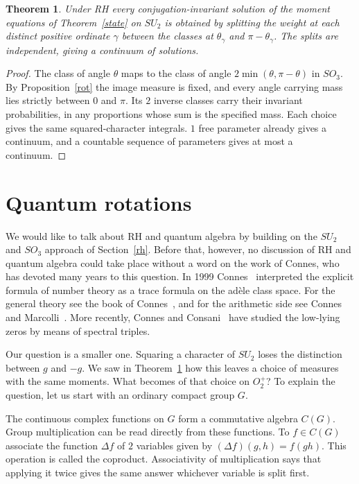 \documentclass[11pt,a4paper]{article}
\newtheorem{thm}{Theorem}[section]
\begin{document}
\begin{samepage}
\begin{thm}\label{classicallifts}
Under RH every conjugation-invariant solution of the moment equations of Theorem~\textup{\ref{state}} on $SU_2$ is obtained by splitting the weight at each distinct positive ordinate $\gamma$ between the classes at $\theta_\gamma$ and $\pi-\theta_\gamma$. The splits are independent, giving a continuum of solutions.
\end{thm}
\end{samepage}
\begin{proof}
The class of angle $\theta$ maps to the class of angle $2\min(\theta,\pi-\theta)$ in $SO_3$. By Proposition~\ref{rot} the image measure is fixed, and every angle carrying mass lies strictly between $0$ and $\pi$. Its $2$ inverse classes carry their invariant probabilities, in any proportions whose sum is the specified mass. Each choice gives the same squared-character integrals. $1$ free parameter already gives a continuum, and a countable sequence of parameters gives at most a continuum.
\end{proof}

\section{Quantum rotations}\label{central}
We would like to talk about RH and quantum algebra by building on the $SU_2$ and $SO_3$ approach of Section~\ref{rh}. Before that, however, no discussion of RH and quantum algebra could take place without a word on the work of Connes, who has devoted many years to this question. In 1999 Connes~\cite{connes} interpreted the explicit formula of number theory as a trace formula on the ad\`ele class space. For the general theory see the book of Connes~\cite{connes-book}, and for the arithmetic side see Connes and Marcolli~\cite{connes-marcolli}. More recently, Connes and Consani~\cite{connes-consani} have studied the low-lying zeros by means of spectral triples.

Our question is a smaller one. Squaring a character of $SU_2$ loses the distinction between $g$ and $-g$. We saw in Theorem~\ref{classicallifts} how this leaves a choice of measures with the same moments. What becomes of that choice on $O_2^+$? To explain the question, let us start with an ordinary compact group $G$.

The continuous complex functions on $G$ form a commutative algebra $C(G)$. Group multiplication can be read directly from these functions. To $f\in C(G)$ associate the function $\Delta f$ of $2$ variables given by $(\Delta f)(g,h)=f(gh)$. This operation is called the coproduct. Associativity of multiplication says that applying it twice gives the same answer whichever variable is split first.
\end{document}
